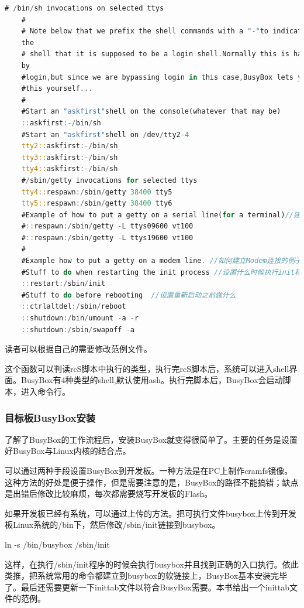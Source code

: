 \begin{lstlisting}[language=Rust]
	# /bin/sh invocations on selected ttys
	#
	# Note below that we prefix the shell commands with a "-"to indicate to
	the
	# shell that it is supposed to be a login shell.Normally this is handled
	by
	#login,but since we are bypassing login in this case,BusyBox lets you do
	#this yourself...
	#
	#Start an "askfirst"shell on the console(whatever that may be)
	::askfirst:-/bin/sh
	#Start an "askfirst"shell on /dev/tty2-4
	tty2::askfirst:-/bin/sh
	tty3::askfirst:-/bin/sh
	tty4::askfirst:-/bin/sh
	#/sbin/getty invocations for selected ttys
	tty4::respawn:/sbin/getty 38400 tty5
	tty5::respawn:/sbin/getty 38400 tty6
	#Example of how to put a getty on a serial line(for a terminal)//建立串口控制台的例子
	#::respawn:/sbin/getty -L ttys09600 vt100
	#::respawn:/sbin/getty -L ttys19600 vt100
	#
	#Example how to put a getty on a modem line. //如何建立Modem连接的例子#::respawn:/sbin/getty 57600 ttyS2
	#Stuff to do when restarting the init process //设置什么时候执行init程序
	::restart:/sbin/init
	#Stuff to do before rebooting  //设置重新启动之前做什么
	::ctrlaltdel:/sbin/reboot
	::shutdown:/bin/umount -a -r
	::shutdown:/sbin/swapoff -a
\end{lstlisting}

读者可以根据自己的需要修改范例文件。

这个函数可以判读rcS脚本中执行的类型，执行完rcS脚本后，系统可以进入shell界面。BusyBox有4种类型的shell,默认使用ash。执行完脚本后，BusyBox会启动脚本，进入命令行。

\subsubsection{目标板BusyBox安装}
了解了BusyBox的工作流程后，安装BusyBox就变得很简单了。主要的任务是设置好BusyBox与Linux内核的结合点。

可以通过两种手段设置BusyBox到开发板。一种方法是在PC上制作cramfs镜像。这种方法的好处是便于操作，但是需要注意的是，BusyBox的路径不能搞错；缺点是出错后修改比较麻烦，每次都需要烧写开发板的Flash。

如果开发板已经有系统，可以通过上传的方法。把可执行文件busybox上传到开发板Linux系统的/bin下，然后修改/sbin/init链接到busybox。

ln -s /bin/busybox /sbin/init

这样，在执行/sbin/init程序的时候会执行busybox并且找到正确的入口执行。依此类推，把系统常用的命令都建立到busybox的软链接上，BusyBox基本安装完毕了。最后还需要更新一下inittab文件以符合BusyBox需要。本书给出一个inittab文件的范例。

